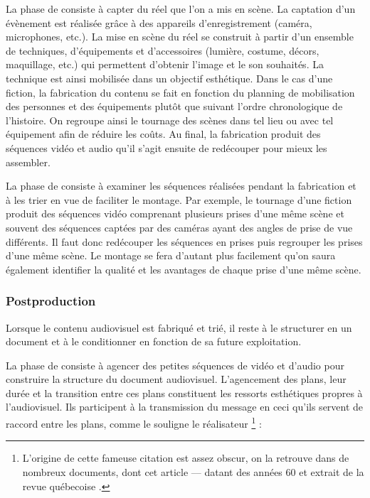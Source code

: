La phase de  consiste à capter du réel que l'on a mis en scène. La captation d'un évènement est réalisée grâce à des appareils d'enregistrement (caméra, microphones, etc.). 
La mise en scène du réel se construit à partir d'un ensemble de techniques, d'équipements et d'accessoires (lumière, costume, décors, maquillage, etc.) qui permettent d'obtenir l'image et le son souhaités. 
La technique est ainsi mobilisée dans un objectif esthétique. 
Dans le cas d'une fiction, la fabrication du contenu se fait en fonction du planning de mobilisation des personnes et des équipements plutôt que suivant l'ordre chronologique de l'histoire. 
On regroupe ainsi le tournage des scènes dans tel lieu ou avec tel équipement afin de réduire les coûts. Au final, la fabrication
produit des séquences vidéo et audio qu'il s'agit ensuite de redécouper pour mieux les assembler.

La phase de  consiste à examiner les séquences réalisées pendant la fabrication et à les trier en vue de faciliter le montage. 
Par exemple, le tournage d'une fiction produit des séquences vidéo comprenant plusieurs prises d'une même scène et souvent des séquences captées par des caméras ayant des angles de prise de vue différents. 
Il faut donc redécouper les séquences en prises puis regrouper les prises d'une même scène. 
Le montage se fera d'autant plus facilement qu'on saura également identifier la qualité et les avantages de chaque prise d'une même scène.


\subsubsection*{Postproduction}
Lorsque le contenu audiovisuel est fabriqué et trié, il reste à le structurer en un document et à le conditionner en fonction de sa future exploitation.

La phase de  consiste à agencer des petites séquences de vidéo et d'audio pour construire la structure du document audiovisuel.
L'agencement des plans, leur durée et la transition entre ces plans constituent les ressorts esthétiques propres à l'audiovisuel. 
Ils participent à la transmission du message en ceci qu'ils servent de raccord entre les plans, comme le souligne le réalisateur \footnote{L'origine de cette fameuse citation est assez obscur, on la retrouve dans de nombreux documents, dont cet article --\cite{Montage et Réalisme}-- datant des années 60 et extrait de la revue québecoise .} :

